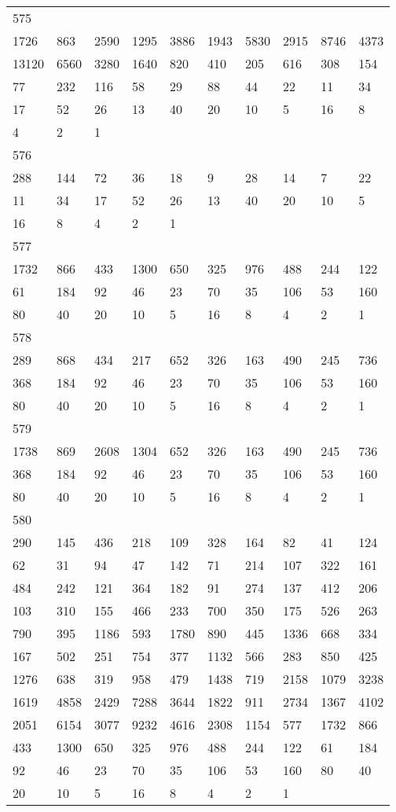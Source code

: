 \begin{longtable}{*{10}{l}}
575&&&&&&&&&\\
1726& 863& 2590& 1295& 3886& 1943& 5830& 2915& 8746& 4373\\
13120& 6560& 3280& 1640& 820& 410& 205& 616& 308& 154\\
77& 232& 116& 58& 29& 88& 44& 22& 11& 34\\
17& 52& 26& 13& 40& 20& 10& 5& 16& 8\\
4& 2& 1& \\

576&&&&&&&&&\\
288& 144& 72& 36& 18& 9& 28& 14& 7& 22\\
11& 34& 17& 52& 26& 13& 40& 20& 10& 5\\
16& 8& 4& 2& 1& \\

577&&&&&&&&&\\
1732& 866& 433& 1300& 650& 325& 976& 488& 244& 122\\
61& 184& 92& 46& 23& 70& 35& 106& 53& 160\\
80& 40& 20& 10& 5& 16& 8& 4& 2& 1\\

578&&&&&&&&&\\
289& 868& 434& 217& 652& 326& 163& 490& 245& 736\\
368& 184& 92& 46& 23& 70& 35& 106& 53& 160\\
80& 40& 20& 10& 5& 16& 8& 4& 2& 1\\

579&&&&&&&&&\\
1738& 869& 2608& 1304& 652& 326& 163& 490& 245& 736\\
368& 184& 92& 46& 23& 70& 35& 106& 53& 160\\
80& 40& 20& 10& 5& 16& 8& 4& 2& 1\\

580&&&&&&&&&\\
290& 145& 436& 218& 109& 328& 164& 82& 41& 124\\
62& 31& 94& 47& 142& 71& 214& 107& 322& 161\\
484& 242& 121& 364& 182& 91& 274& 137& 412& 206\\
103& 310& 155& 466& 233& 700& 350& 175& 526& 263\\
790& 395& 1186& 593& 1780& 890& 445& 1336& 668& 334\\
167& 502& 251& 754& 377& 1132& 566& 283& 850& 425\\
1276& 638& 319& 958& 479& 1438& 719& 2158& 1079& 3238\\
1619& 4858& 2429& 7288& 3644& 1822& 911& 2734& 1367& 4102\\
2051& 6154& 3077& 9232& 4616& 2308& 1154& 577& 1732& 866\\
433& 1300& 650& 325& 976& 488& 244& 122& 61& 184\\
92& 46& 23& 70& 35& 106& 53& 160& 80& 40\\
20& 10& 5& 16& 8& 4& 2& 1& \\


\end{longtable}
